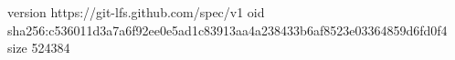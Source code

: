 version https://git-lfs.github.com/spec/v1
oid sha256:c536011d3a7a6f92ee0e5ad1c83913aa4a238433b6af8523e03364859d6fd0f4
size 524384
